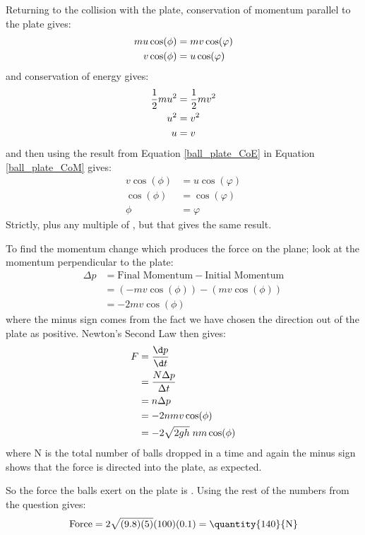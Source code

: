 \begin{problem}[HSC1946P1X1a]
{Returning to the collision with the plate, conservation of momentum parallel to the plate gives:
\begin{eqnarray*}
 mu\cos(\phi) &= mv\cos(\varphi) \notag \\ 
 v\cos(\phi) &= u\cos(\varphi) \label{ball_plate_CoM} 
 \end{eqnarray*}
and conservation of energy gives:
\begin{eqnarray*}
 \frac{1}{2}mu^{2} &= \frac{1}{2}{m}v^{2} \notag \\ 
 u^{2} &= v^{2} \notag \\ 
 u &= v \label{ball_plate_CoE} 
\end{eqnarray*}
and then using the result from Equation \eqref{ball_plate_CoE} in Equation \eqref{ball_plate_CoM} gives:
\begin{eqnarray*} 
v\cos(\phi) &= u\cos(\varphi) \\ 
\cos(\phi) &= \cos(\varphi) \\ 
\phi &= \varphi
\end{eqnarray*}
Strictly, \value{\phi}{\varphi}{} plus any multiple of \quantity{2\pi}{}, but that gives the same result.

To find the momentum change which produces the force on the plane; look at the momentum perpendicular to the plate:
\begin{eqnarray*}
 \Delta p &= \text{Final Momentum} - \text{Initial Momentum} \\ 
 &= (-mv\cos(\phi)) - (mv\cos(\phi)) \\ 
 &= -2mv\cos(\phi) 
 \end{eqnarray*}
where the minus sign comes from the fact we have chosen the direction out of the plate as positive. Newton's Second Law then gives:
\begin{eqnarray*} 
F &= \frac{\d p}{\d t} \\ 
&= \frac{N \Delta p}{\Delta t} \\ 
&= n\Delta p \\ &= -2nmv\cos(\phi) \\ 
&= -2\sqrt{2gh}\;nm\cos(\phi) 
\end{eqnarray*}
where N is the total number of balls dropped in a time  and again the minus sign shows that the force is directed into the plate, as expected.

So the force the balls exert on the plate is . Using the rest of the numbers from the question gives:
\begin{equation*} 
\text{Force} = 2\sqrt{(9.8)(5)}(100)(0.1)= \mbox{\quantity{140}{N}} 
\end{equation*}
}
\end{problem}